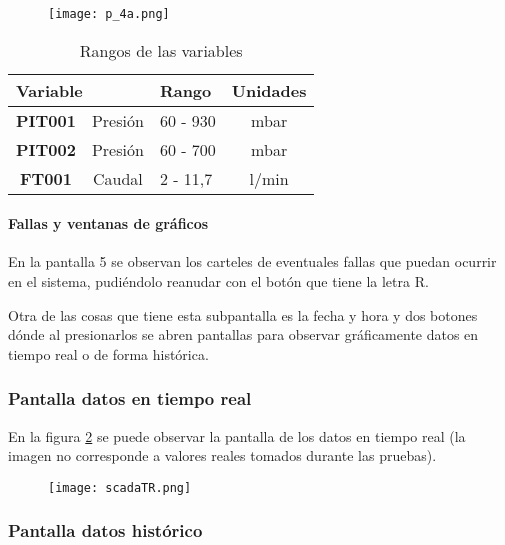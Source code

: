 \begin{figure}[h!]
	\centering
	\texttt{[image: p\_4a.png]}
	\label{fig:LC}
\end{figure}
\begin{table}[]
	\centering
	
	\begin{tabular}{|cc|l|c|}
		\hline
		\multicolumn{2}{|l|}{\textbf{Variable}} & \textbf{Rango} & \multicolumn{1}{l|}{\textbf{Unidades}} \\ \hline
		\multicolumn{1}{|c|}{\textbf{PIT001}} & Presión & 60 - 930 & mbar \\ \hline
		\multicolumn{1}{|c|}{\textbf{PIT002}} & Presión & 60 - 700 & mbar \\ \hline
		\multicolumn{1}{|c|}{\textbf{FT001}} & Caudal & 2 - 11,7 & l/min \\ \hline
	\end{tabular}
\caption{Rangos de las variables}
\label{tab:rang}
\end{table}

\paragraph{Fallas y ventanas de gráficos}
En la pantalla 5 se observan los carteles de eventuales fallas que puedan ocurrir en el sistema, pudiéndolo reanudar con el botón que tiene la letra R.

Otra de las cosas que tiene esta subpantalla es la fecha y hora y dos botones dónde al presionarlos se abren pantallas para observar gráficamente datos en tiempo real o de forma histórica.

\subsubsection{Pantalla datos en tiempo real}
En la figura \ref{fig:scadaTR} se puede observar la pantalla de los datos en tiempo real (la imagen no corresponde a valores reales tomados durante las pruebas).
\begin{figure}[h!]
	\centering
	\texttt{[image: scadaTR.png]}
	\label{fig:scadaTR}
\end{figure}

\subsubsection{Pantalla datos histórico}

